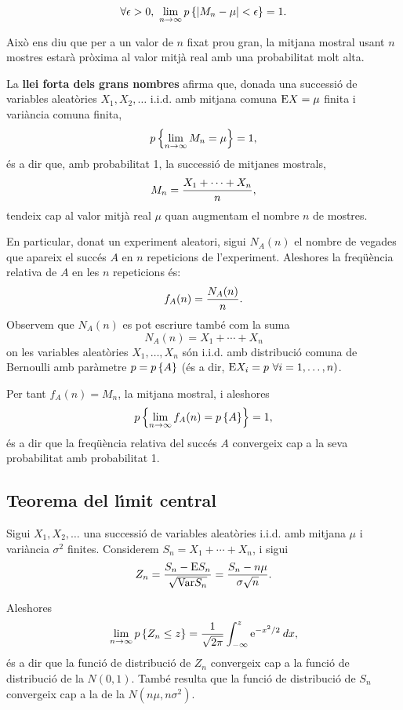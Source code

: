 $$\forall \epsilon > 0, \ \lim_{n \to \infty} p\left\{|M_n - \mu| < \epsilon\right\} = 1.$$

Aix\`o ens diu que per a un valor de $n$ fixat prou gran, la mitjana mostral
usant $n$ mostres estar\`a pr\`oxima al valor mitj\`a real amb una probabilitat molt
alta. 

La {\bf llei forta dels grans nombres}
 afirma que, donada una successi\'o de
variables aleat\`ories $X_1, X_2, \ldots $ i.i.d. amb mitjana comuna ${\rm E} X = \mu$
finita i vari\`ancia comuna finita,
$$p\left\{\lim_{n \to \infty} M_n = \mu\right\} = 1,$$
\'es a dir que, amb probabilitat 1, la successi\'o de mitjanes mostrals,
$$ M_n = {X_1 + \cdots + X_n \over n},$$
tendeix cap al valor mitj\`a real $\mu$ quan augmentam el nombre $n$ de mostres.

En particular, donat un experiment aleatori, sigui $N_A(n)$ 
el nombre de vegades que apareix el succ\'es $A$ en $n$ repeticions de l'experiment. 
Aleshores la freq\"u\`encia relativa de $A$ en les $n$ repeticions \'es:
$$
f_A(n) = {N_A(n) \over n}.
$$
Observem que $N_A(n)$ es pot escriure tamb\'e com la suma
$$N_A(n) = X_1 + \cdots + X_n
$$
on les variables aleat\`ories $X_1, \ldots , X_n$ s\'on i.i.d. 
amb distribuci\'o comuna de Bernoulli amb par\`ametre 
$p = p\left\{A\right\}$ (\'es a dir, ${\rm E} X_i =p\ \forall i=1,\ldots,n)$.

Per tant $f_A(n) = M_n$, la mitjana mostral, i aleshores
$$p\left\{\lim_{n \to \infty} f_A(n) = p\left\{A\right\}\right\} = 1,$$
\'es a dir que la freq\"u\`encia relativa del succ\'es $A$ convergeix cap a la seva probabilitat amb probabilitat 1.

\subsection{Teorema del l\'{\i}mit central}

Sigui $X_1, X_2, \ldots $ una successi\'o de variables aleat\`ories i.i.d. amb
mitjana $\mu$ i vari\`ancia $\sigma^2$ finites. Considerem $S_n = X_1 + \cdots +
X_n$, i sigui
$$Z_n = {S_n - {\rm E} S_n \over \sqrt{{\rm Var} S_n}} = {S_n - n \mu \over \sigma
\sqrt{n}}.$$

Aleshores
$$\lim_{n \to \infty} p\left\{Z_n \leq z\right\} = {1 \over \sqrt{2 \pi}} \int_{-\infty}^z
{\rm e}^{-x^2/2} \> dx,$$
\'es a dir que la funci\'o de distribuci\'o de $Z_n$ convergeix cap a la funci\'o de
distribuci\'o de la $N(0,1)$. Tamb\'e resulta que la funci\'o de distribuci\'o de $S_n$
convergeix cap a la de la $N(n \mu, n \sigma^2)$.

